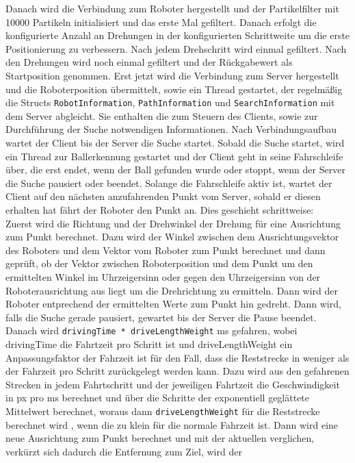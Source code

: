 Danach wird die Verbindung zum Roboter hergestellt und der Partikelfilter
mit 10000 Partikeln initialisiert und das erste Mal gefiltert. Danach
erfolgt die konfigurierte Anzahl an Drehungen in der konfigurierten
Schrittweite um die erste Positionierung zu verbessern. Nach jedem
Drehschritt wird einmal gefiltert. Nach den Drehungen wird noch einmal
gefiltert und der Rückgabewert als Startposition genommen. Erst jetzt wird
die Verbindung zum Server hergestellt und die Roboterposition übermittelt,
sowie ein Thread gestartet, der regelmäßig die Structs \lstinline|RobotInformation|,
\lstinline|PathInformation| und \lstinline|SearchInformation| mit dem
Server abgleicht.  Sie enthalten die zum Steuern des Clients, sowie zur
Durchführung der Suche notwendigen Informationen.  Nach
Verbindungsaufbau wartet der Client bis der Server die Suche startet. 
Sobald die Suche startet, wird ein  Thread zur
Ballerkennung gestartet und der Client geht in seine Fahrschleife über, die
 erst endet, wenn der Ball gefunden wurde oder stoppt, wenn der Server
 die Suche pausiert oder beendet. Solange die Fahrschleife aktiv ist,
 wartet der Client auf den nächsten anzufahrenden Punkt vom Server,
sobald er diesen erhalten hat fährt der Roboter den Punkt an.
Dies geschieht schrittweise:\\
Zuerst wird die Richtung und der Drehwinkel der Drehung für eine
Ausrichtung zum Punkt berechnet. Dazu wird der Winkel zwischen dem
Ausrichtungsvektor des Roboters und dem Vektor vom Roboter zum Punkt berechnet und dann geprüft,
ob der Vektor zwischen Roboterposition und dem Punkt um den ermittelten
Winkel im Uhrzeigersinn oder gegen den Uhrzeigersinn von der
Roboterausrichtung aus liegt um die Drehrichtung zu ermitteln. Dann wird
der Roboter entprechend der ermittelten Werte zum Punkt hin gedreht.
Dann wird, falls die Suche gerade pausiert, gewartet bis der Server die
Pause beendet. Danach wird 
\lstinline|drivingTime * driveLengthWeight| ms gefahren, wobei drivingTime die
Fahrtzeit pro Schritt ist und driveLengthWeight ein Anpassungsfaktor der
Fahrzeit ist für den Fall, dass die Reststrecke in weniger als der
Fahrzeit pro Schritt zurückgelegt werden kann. Dazu wird aus den gefahrenen Strecken in jedem
Fahrtschritt und der jeweiligen Fahrtzeit die Geschwindigkeit in px pro ms
berechnet und über die Schritte der exponentiell geglättete Mittelwert
berechnet, woraus dann \lstinline|driveLengthWeight| für die Reststrecke berechnet wird
, wenn die zu klein für die normale Fahrzeit ist. 
Dann wird eine neue Ausrichtung zum Punkt berechnet und mit der aktuellen
 verglichen, verkürzt sich dadurch die Entfernung zum Ziel, wird der
